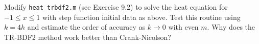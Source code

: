 Modify \texttt{heat\_trbdf2.m} (see Exercise 9.2) to solve the heat equation for $-1 \le x \le 1$ with step function
initial data as above. Test this routine using $k = 4h$ and estimate the order of accuracy as $k \to 0$ with even $m$.
Why does the TR-BDF2 method work better than Crank-Nicolson?

\begin{solution}\ \\\\
    \hfill\vfill
    \ \\
\end{solution}